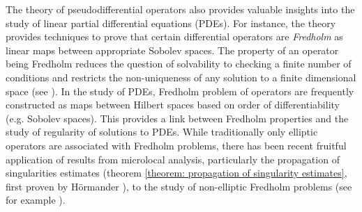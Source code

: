 \documentclass[12pt, twoside]{book}
\begin{document}
The theory of pseudodifferential operators also provides valuable insights into the study of linear partial differential equations (PDEs). For instance, the theory provides techniques to prove that certain differential operators are \textit{Fredholm} as linear maps between appropriate Sobolev spaces. The property of an operator being Fredholm reduces the question of solvability to checking a finite number of conditions and restricts the non-uniqueness of any solution to a finite dimensional space (see \cite{Ramm2001-ep}). In the study of PDEs, Fredholm problem of operators are frequently constructed as maps between Hilbert spaces based on order of differentiability (e.g. Sobolev spaces). This provides a link between Fredholm properties and the study of regularity of solutions to PDEs. While traditionally only elliptic operators are associated with Fredholm problems, there has been recent fruitful application of results from microlocal analysis, particularly the propagation of singularities estimates (theorem \ref{theorem: propagation of singularity estimates}, first proven by H\"ormander \cite{Hormander1978-xs}), to the study of non-elliptic Fredholm problems (see for example \cite{Vasy2013-qt,Gell-Redman2016-sg}). \\
\end{document}
